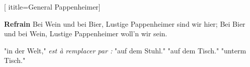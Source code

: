  [
ititle={General Pappenheimer}]

\beginverse
{}
\endverse

\beginchorus
\textbf{Refrain}
Bei Wein und bei Bier,
Lustige Pappenheimer sind wir hier;
Bei Bier und bei Wein,
Lustige Pappenheimer woll'n wir sein.
\endchorus

\beginverse
"in der Welt," \emph{est à remplacer par :} "auf dem Stuhl."
"auf dem Tisch."
"unterm Tisch."
\endverse
\endsong